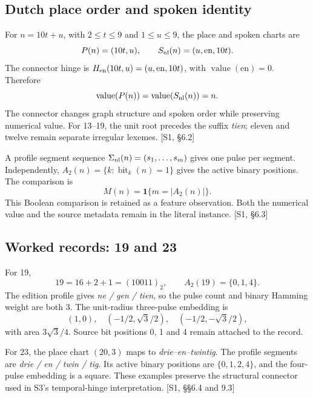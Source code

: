 \documentclass[11pt,a4paper]{article}
\numberwithin{equation}{section}
\newcommand{\src}[2]{{\sffamily\small\color{slate}[#1, #2]}}
\newcommand{\ind}{\mathbf 1}
\newcommand{\val}{\operatorname{value}}
\begin{document}
\subsection{Dutch place order and spoken identity}
For $n=10t+u$, with $2\le t\le9$ and $1\le u\le9$, the place and spoken charts are
\begin{equation}
P(n)=(10t,u),\qquad S_{\rm nl}(n)=(u,\mathrm{en},10t).
\end{equation}
The connector hinge is $H_{\rm en}(10t,u)=(u,\mathrm{en},10t)$, with $\val(\mathrm{en})=0$. Therefore
\begin{equation}
\val(P(n))=\val(S_{\rm nl}(n))=n.
\end{equation}
The connector changes graph structure and spoken order while preserving numerical value. For 13--19, the unit root precedes the suffix \emph{tien}; eleven and twelve remain separate irregular lexemes. \src{S1}{\S6.2}

A profile segment sequence $\Sigma_{\rm nl}(n)=(s_1,\ldots,s_m)$ gives one pulse per segment. Independently, $A_2(n)=\{k:\operatorname{bit}_k(n)=1\}$ gives the active binary positions. The comparison is
\begin{equation}
M(n)=\ind\{m=|A_2(n)|\}.
\end{equation}
This Boolean comparison is retained as a feature observation. Both the numerical value and the source metadata remain in the literal instance. \src{S1}{\S6.3}

\subsection{Worked records: 19 and 23}
For 19,
\begin{equation}
19=16+2+1=(10011)_2,\qquad A_2(19)=\{0,1,4\}.
\end{equation}
The edition profile gives \emph{ne / gen / tien}, so the pulse count and binary Hamming weight are both 3. The unit-radius three-pulse embedding is
\begin{equation}
(1,0),\quad(-1/2,\sqrt3/2),\quad(-1/2,-\sqrt3/2),
\end{equation}
with area $3\sqrt3/4$. Source bit positions 0, 1 and 4 remain attached to the record.

For 23, the place chart $(20,3)$ maps to \emph{drie--en--twintig}. The profile segments are \emph{drie / en / twin / tig}. Its active binary positions are $\{0,1,2,4\}$, and the four-pulse embedding is a square. These examples preserve the structural connector used in S3's temporal-hinge interpretation. \src{S1}{§§6.4 and 9.3}
\end{document}
